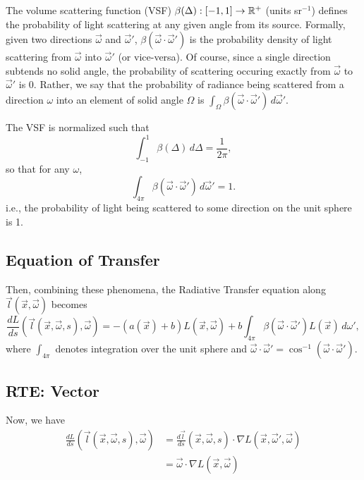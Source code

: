 The volume scattering function (VSF) $\beta(\Delta): [-1, 1] \to \mathbb{R}^+$ (units sr$^{-1}$) defines the probability of light scattering at any given angle from its source.
Formally, given two directions $\vec{\omega}$ and $\vec{\omega}'$, $\beta(\vec{\omega} \cdot \vec{\omega}')$ is the probability density of light scattering from $\vec{\omega}$ into $\vec{\omega}'$ (or vice-versa).
Of course, since a single direction subtends no solid angle, the probability of scattering occuring exactly from $\vec{\omega}$ to $\vec{\omega}'$ is 0.
Rather, we say that the probability of radiance being scattered from a direction $\omega$ into an element of solid angle $\Omega$ is $\int_\Omega \beta(\vec{\omega} \cdot \vec{\omega}')\, d\vec{\omega}'$.

The VSF is normalized such that
\begin{equation}
  \int_{-1}^1\beta(\Delta)\, d\Delta=\frac{1}{2\pi},
\end{equation}
so that for any $\omega$,
\begin{equation}
  \int_{4\pi}\beta(\vec{\omega}\cdot\vec{\omega}')\, d\vec{\omega}' = 1.
\end{equation}
i.e., the probability of light being scattered to some direction on the unit sphere is 1.

\subsection{Equation of Transfer}
Then, combining these phenomena, the Radiative Transfer equation along
$\vec{l}(\vec{x}, \vec{\omega})$ becomes
\begin{equation}
  \label{eqn:rte1d}
  \frac{dL}{ds}(\vec{l}(\vec{x}, \vec{\omega}, s), \vec{\omega})
  = -(a(\vec{x}) + b)L(\vec{x}, \vec{\omega})
  + b \int_{4\pi} \beta(\vec{\omega}\cdot\vec{\omega}') L(\vec{x})\, d\omega',
\end{equation}
where $\int_{4\pi}$ denotes integration over the unit sphere and
$\vec{\omega}\cdot\vec{\omega}' = \cos^{-1}(\vec{\omega}\cdot\vec{\omega}')$.

\subsection{RTE: Vector}

Now, we have
\begin{align*}
  \frac{dL}{ds}(\vec{l}(\vec{x}, \vec{\omega}, s), \vec{\omega})
    &= \frac{d\vec{l}}{ds}(\vec{x}, \vec{\omega}, s) \cdot \nabla L(\vec{x}, \vec{\omega}', \vec{\omega}) \\
    &= \vec{\omega} \cdot \nabla L(\vec{x}, \vec{\omega})
\end{align*}

